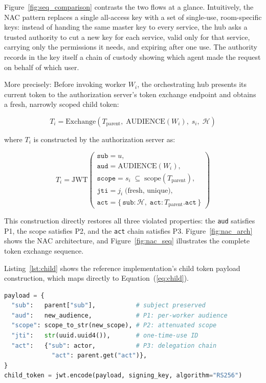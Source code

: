 \documentclass[journal]{IEEEtran}
\begin{document}
Figure~\ref{fig:seq_comparison} contrasts the two flows at a glance.
Intuitively, the NAC pattern replaces a single all-access key with a set of
single-use, room-specific keys: instead of handing the same master key to every
service, the hub asks a trusted authority to cut a new key for each service,
valid only for that service, carrying only the permissions it needs, and expiring
after one use. The authority records in the key itself a chain of custody showing
which agent made the request on behalf of which user.

More precisely: Before invoking worker $W_i$, the orchestrating hub presents its
current token to the authorization server's token exchange endpoint and obtains a
fresh, narrowly scoped child token:

\begin{equation}
T_i = \mathrm{Exchange}\!\left(
  T_{\mathrm{parent}},\;
  \mathrm{AUDIENCE}(W_i),\;
  s_i,\;
  \mathcal{H}
\right)
\label{eq:exchange}
\end{equation}

where $T_i$ is constructed by the authorization server as:

\begin{equation}
T_i = \mathrm{JWT}\!\left(\begin{array}{l}
  \texttt{sub} = u, \\[2pt]
  \texttt{aud} = \mathrm{AUDIENCE}(W_i), \\[2pt]
  \texttt{scope} = s_i \;\subseteq\; \mathrm{scope}(T_{\mathrm{parent}}), \\[2pt]
  \texttt{jti} = j_i \;\text{(fresh, unique)}, \\[2pt]
  \texttt{act} = \{\,\texttt{sub}\text{:}\,\mathcal{H},\;
                    \texttt{act}\text{:}\,T_{\mathrm{parent}}.\texttt{act}\,\}
\end{array}\right)
\label{eq:child}
\end{equation}

This construction directly restores all three violated properties: the
\texttt{aud} satisfies P1, the scope satisfies P2, and the \texttt{act} chain
satisfies P3. Figure~\ref{fig:nac_arch} shows the NAC architecture, and
Figure~\ref{fig:nac_seq} illustrates the complete token exchange sequence.

Listing~\ref{lst:child} shows the reference implementation's child token
payload construction, which maps directly to Equation~(\ref{eq:child}).

\begin{lstlisting}[language=Python, label=lst:child,
  caption={Child token construction (\texttt{nac\_common.py}).
  Each field enforces one security property.}]
payload = {
  "sub":   parent["sub"],           # subject preserved
  "aud":   new_audience,            # P1: per-worker audience
  "scope": scope_to_str(new_scope), # P2: attenuated scope
  "jti":   str(uuid.uuid4()),       # one-time-use ID
  "act":   {"sub": actor,           # P3: delegation chain
             "act": parent.get("act")},
}
child_token = jwt.encode(payload, signing_key, algorithm="RS256")
\end{lstlisting}
\end{document}
